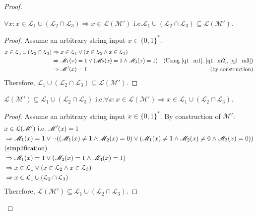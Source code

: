 \documentclass[usletter]{article}
\newcommand {\langset}[1]      {\ensuremath{\mathcal{#1}}}
\newcommand {\machine}[1]      {\ensuremath{\mathscr{#1}}}
\newcommand{\ie}{\textnormal{i.e.}}
\newcommand {\langL}          {\langset{L}}
\newcommand {\machineM}       {\machine{M}}
\newcommand {\allstrings}     {\ensuremath{\{0,1\}^*}}
\begin{document}
\begin{enumerate}
\begin{proof}
    \begin{claim}
      $\forall x : x \in \langL_1 \cup (\langL_2 \cap \langL_3)
                  \Rightarrow x \in \langL(\machineM')$
      \ie $\langL_1 \cup (\langL_2 \cap \langL_3) \subseteq \langL(\machineM')$.
    \end{claim}
    \begin{proof}
      Assume an arbitrary string input $x \in \allstrings$.
      \begin{align*}
        x \in \langL_1 \cup (\langL_2 \cap \langL_3)
          &\Rightarrow x \in \langL_1
              \vee (x \in \langL_2 \wedge x \in \langL_3) \\
          &\Rightarrow \machineM_1(x) = 1
            \vee (\machineM_2(x) = 1 \wedge \machineM_3(x) = 1)
            & \textnormal{(Using \ref{q1_m1}, \ref{q1_m2}, \ref{q1_m3})} \\
          &\Rightarrow \machineM'(x) = 1 & \textnormal{(by construction)}
      \end{align*}
      Therefore,
      $\langL_1 \cup (\langL_2 \cap \langL_3) \subseteq \langL(\machineM')$.
    \end{proof}

    \begin{claim}
      $\langL(\machineM') \subseteq \langL_1 \cup (\langL_2 \cap \langL_3)$
      \ie $\forall x : x \in \langL(\machineM')
                      \Rightarrow x \in \langL_1 \cup (\langL_2 \cap \langL_3)$.
    \end{claim}
    \begin{proof}
      Assume an arbitrary string input $x \in \allstrings$.
      By construction of $\machineM'$:
      \begin{align*}
        &x \in \langL(\machineM') \ \ie \ \machineM'(x) = 1 \\
        &\Rightarrow \machineM_1(x) = 1
          \vee \neg ((\machineM_1(x) \neq 1 \wedge \machineM_2(x) = 0)
                     \vee (\machineM_1(x) \neq 1 \wedge \machineM_2(x) \neq 0
                                                 \wedge \machineM_3(x) = 0)) \\
        &\textnormal{(simplification)} \\
        &\Rightarrow \machineM_1(x) = 1
          \vee (\machineM_2(x) = 1 \wedge \machineM_3(x) = 1) \\
        &\Rightarrow x \in \langL_1
          \vee (x \in \langL_2 \wedge x \in \langL_3) \\
        &\Rightarrow x \in \langL_1 \cup (\langL_2 \cap \langL_3)
      \end{align*}
      Therefore,
      $\langL(\machineM') \subseteq \langL_1 \cup (\langL_2 \cap \langL_3)$.
    \end{proof}


\end{proof}
\end{enumerate}
\end{document}
